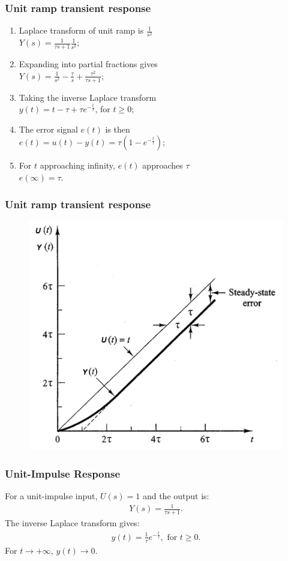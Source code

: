 \begin{frame}
\frametitle{Unit ramp transient response}
\begin{enumerate}
\item Laplace transform of unit ramp is $\frac{1}{s^2}$
\\ $Y(s) = \frac{1}{\tau s +1} \frac{1}{s^2}$;
\item Expanding into partial fractions gives
\\ $Y(s)= \frac{1}{s^2} - \frac{\tau}{s} + \frac{\tau^2}{\tau s +1}$;
\item Taking the inverse Laplace transform 
\\ $y(t) = t -\tau + \tau e^{-\frac{t}{\tau}}$, for $t\ge 0$;
\item The error signal $e(t)$ is then
\\ $e(t)=u(t) -y(t) = \tau(1-e^{-\frac{t}{\tau}})$;
\item For $t$ approaching infinity, $e(t)$ approaches $\tau$
\\ $e(\infty) = \tau$.
\end {enumerate}
\end{frame}

\begin{frame}
\frametitle{Unit ramp transient response}
	\begin{figure}
		\includegraphics[width=0.6\linewidth]{Afbeelding4}
	\end{figure}
\end{frame}

\begin{frame}
\frametitle{Unit-Impulse Response}
For a unit-impulse input, $U(s)=1$ and the output is:
\vspace{0.15cm}
\begin{align*}
Y(s)=\frac{1}{\tau s +1}.
\end{align*}
\vspace{0.15cm}
The inverse Laplace transform gives:
\vspace{0.15cm}
\begin{align*}
y(t)= \frac{1}{\tau}e^{-\frac{t}{\tau}} ,\text{ for } t \ge 0.
\end{align*}
\vspace{0.15cm}
For $t\rightarrow +\infty$, $y(t)\rightarrow 0$.
\end{frame}

